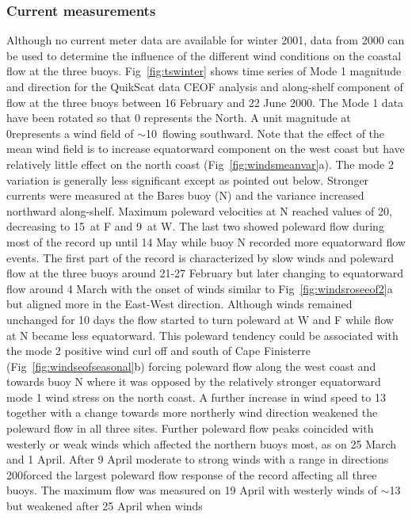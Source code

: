 \subsubsection{Current measurements}
Although no current meter data are available for winter 2001, data
from 2000 can be used to determine the influence of the different
wind conditions on the coastal flow at the three buoys.
Fig~\ref{fig:tswinter} shows time series of Mode 1 magnitude and
direction for the QuikScat data CEOF analysis and along-shelf
component of flow at the three buoys between 16 February and 22
June 2000. The Mode 1 data have been rotated so that 0\deg
represents the North. A unit magnitude at 0\deg represents a wind
field of $\sim$10\vel\, flowing southward. Note that the effect of
the mean wind field is to increase equatorward component on the
west coast but have relatively little effect on the north coast
(Fig~\ref{fig:windsmeanvar}a). The mode 2 variation is generally
less significant except as pointed out below. Stronger currents
were measured at the Bares buoy (N) and the variance increased
northward along-shelf. Maximum poleward velocities at N reached
values of 20\velc, decreasing to 15\velc\, at F and 9\velc\, at W.
The last two showed poleward flow during most of the record up
until 14 May while buoy N recorded more equatorward flow events.
The first part of the record is characterized by slow winds and
poleward flow at the three buoys around 21-27 February but later
changing to equatorward flow around 4 March with the onset of
winds similar to Fig~\ref{fig:windsroseeof2}a but aligned more in
the East-West direction. Although winds remained unchanged for 10
days the flow started to turn poleward at W and F while flow at N
became less equatorward. This poleward tendency could be
associated with the mode 2 positive wind curl off and south of
Cape Finisterre (Fig~\ref{fig:windseofseasonal}b) forcing poleward
flow along the west coast and towards buoy N where it was opposed
by the relatively stronger equatorward mode 1 wind stress on the
north coast. A further increase in wind speed to 13\vel\, together
with a change towards more northerly wind direction weakened the
poleward flow in all three sites. Further poleward flow peaks
coincided with westerly or weak winds which affected the northern
buoys most, as on 25 March and 1 April. After 9 April moderate to
strong winds with a range in directions 200\deg forced the
largest poleward flow response of the record affecting all three
buoys. The maximum flow was measured on 19 April with westerly
winds of $\sim$13\vel\, but weakened after 25 April when winds
